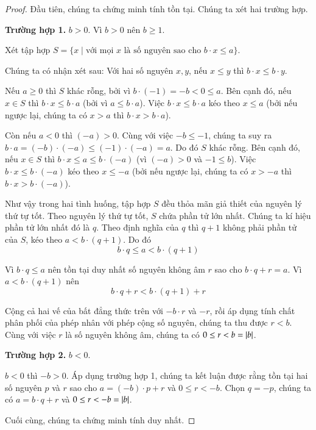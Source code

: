 \begin{proof}
	Đầu tiên, chúng ta chứng minh tính tồn tại. Chúng ta xét hai trường hợp.

	\textbf{Trường hợp 1.} $b > 0$. Vì $b > 0$ nên $b\geq 1$.

	Xét tập hợp $S = \{ x \mid \text{với mọi $x$ là số nguyên sao cho $b\cdot x\leq a$} \}$.

	Chúng ta có nhận xét sau: Với hai số nguyên $x, y$, nếu $x\leq y$ thì $b\cdot x \leq b\cdot y$.
	\bigskip

	Nếu $a\geq 0$ thì $S$ khác rỗng, bởi vì $b\cdot (-1) = -b < 0 \leq a$. Bên cạnh đó, nếu $x\in S$ thì $b\cdot x \leq b\cdot a$ (bởi vì $a\leq b\cdot a$). Việc $b\cdot x \leq b\cdot a$ kéo theo $x\leq a$ (bởi nếu ngược lại, chúng ta có $x > a$ thì $b\cdot x > b\cdot a$).

	Còn nếu $a < 0$ thì $(-a) > 0$. Cùng với việc $-b\leq -1$, chúng ta suy ra $b\cdot a = (-b)\cdot (-a)\leq (-1)\cdot(-a) = a$. Do đó $S$ khác rỗng. Bên cạnh đó, nếu $x\in S$ thì $b\cdot x \leq a\leq b\cdot (-a)$ (vì $(-a) > 0$ và $-1\leq b$). Việc $b\cdot x\leq b\cdot (-a)$ kéo theo $x\leq -a$ (bởi nếu ngược lại, chúng ta có $x > -a$ thì $b\cdot x > b\cdot (-a)$).

	Như vậy trong hai tình huống, tập hợp $S$ đều thỏa mãn giả thiết của nguyên lý thứ tự tốt. Theo nguyên lý thứ tự tốt, $S$ chứa phần tử lớn nhất. Chúng ta kí hiệu phần tử lớn nhất đó là $q$. Theo định nghĩa của $q$ thì $q+1$ không phải phần tử của $S$, kéo theo $a < b\cdot (q + 1)$. Do đó
	\[
		b\cdot q\leq a < b\cdot (q + 1)
	\]

	Vì $b\cdot q\leq a$ nên tồn tại duy nhất số nguyên không âm $r$ sao cho $b\cdot q + r = a$. Vì $a < b\cdot (q + 1)$ nên
	\[
		b\cdot q + r < b\cdot (q + 1) + r
	\]

	Cộng cả hai vế của bất đẳng thức trên với $-b\cdot r$ và $-r$, rồi áp dụng tính chất phân phối của phép nhân với phép cộng số nguyên, chúng ta thu được $r < b$. Cùng với việc $r$ là số nguyên không âm, chúng ta có $0\leq r < b = \left\vert{b}\right\vert$.

	\textbf{Trường hợp 2.} $b < 0$.

	$b < 0$ thì $-b > 0$. Áp dụng trường hợp 1, chúng ta kết luận được rằng tồn tại hai số nguyên $p$ và $r$ sao cho $a = (-b)\cdot p + r$ và $0\leq r < -b$. Chọn $q = -p$, chúng ta có $a = b\cdot q + r$ và $0\leq r < -b = \left\vert{b}\right\vert$.

	\bigskip

	Cuối cùng, chúng ta chứng minh tính duy nhất.


\end{proof}
